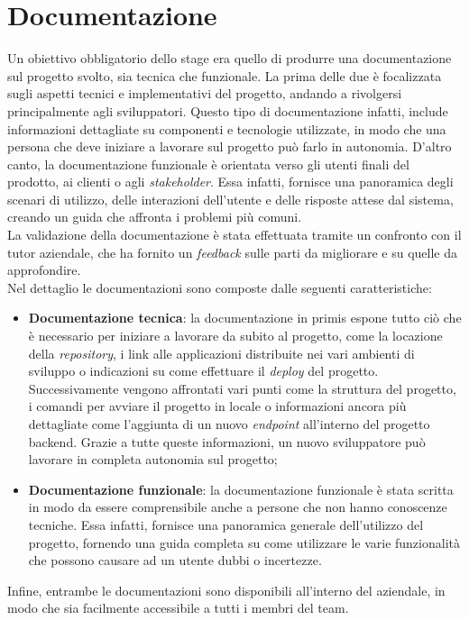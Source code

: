 \section{Documentazione}
Un obiettivo obbligatorio dello stage era quello di produrre una documentazione sul progetto svolto, sia tecnica che funzionale.
La prima delle due è focalizzata sugli aspetti tecnici e implementativi del progetto, andando a rivolgersi principalmente agli sviluppatori.
Questo tipo di documentazione infatti, include informazioni dettagliate su componenti e tecnologie utilizzate, in modo che una persona che deve iniziare a lavorare sul progetto
può farlo in autonomia.
D'altro canto, la documentazione funzionale è orientata verso gli utenti finali del prodotto, ai clienti o agli \textit{stakeholder}.
Essa infatti, fornisce una panoramica degli scenari di utilizzo, delle interazioni dell'utente e delle risposte attese dal sistema, creando un guida che affronta i problemi più comuni.\\
La validazione della documentazione è stata effettuata tramite un confronto con il tutor aziendale, che ha fornito un \textit{feedback} sulle parti da migliorare e su quelle da approfondire.\\
Nel dettaglio le documentazioni sono composte dalle seguenti caratteristiche:
\begin{itemize}
  \item \textbf{Documentazione tecnica}: la documentazione in primis espone tutto ciò che è necessario per iniziare a lavorare da subito al progetto, come la locazione della \textit{repository}, i link 
  alle applicazioni distribuite nei vari ambienti di sviluppo o indicazioni su come effettuare il \textit{deploy} del progetto.\\
  Successivamente vengono affrontati vari punti come la struttura del progetto, i comandi per avviare il progetto in locale o informazioni ancora più dettagliate come l'aggiunta di un nuovo \textit{endpoint} all'interno del progetto backend.
  Grazie a tutte queste informazioni, un nuovo sviluppatore può lavorare in completa autonomia sul progetto;
  \item \textbf{Documentazione funzionale}: la documentazione funzionale è stata scritta in modo da essere comprensibile anche a persone che non hanno conoscenze tecniche.
  Essa infatti, fornisce una panoramica generale dell'utilizzo del progetto, fornendo una guida completa su come utilizzare le varie funzionalità che possono
  causare ad un utente dubbi o incertezze.
\end{itemize}
Infine, entrambe le documentazioni sono disponibili all'interno del  aziendale, in modo che sia facilmente accessibile a tutti i membri del team.

